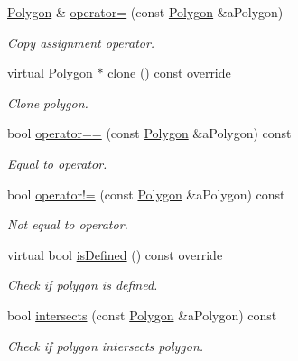 \begin{DoxyCompactItemize}
\hyperlink{classostk_1_1math_1_1geom_1_1d2_1_1objects_1_1_polygon}{Polygon} \& \hyperlink{classostk_1_1math_1_1geom_1_1d2_1_1objects_1_1_polygon_aad1bdf4404a88c3da5c93e12e0cbb241}{operator=} (const \hyperlink{classostk_1_1math_1_1geom_1_1d2_1_1objects_1_1_polygon}{Polygon} \&a\+Polygon)
\begin{DoxyCompactList}\small\item\em Copy assignment operator. \end{DoxyCompactList}\item 
virtual \hyperlink{classostk_1_1math_1_1geom_1_1d2_1_1objects_1_1_polygon}{Polygon} $\ast$ \hyperlink{classostk_1_1math_1_1geom_1_1d2_1_1objects_1_1_polygon_a55e4524d1f58bf8379580e63f49f0b48}{clone} () const override
\begin{DoxyCompactList}\small\item\em Clone polygon. \end{DoxyCompactList}\item 
bool \hyperlink{classostk_1_1math_1_1geom_1_1d2_1_1objects_1_1_polygon_a6fa3a2d3811523250bbb916e5d0ff8b9}{operator==} (const \hyperlink{classostk_1_1math_1_1geom_1_1d2_1_1objects_1_1_polygon}{Polygon} \&a\+Polygon) const
\begin{DoxyCompactList}\small\item\em Equal to operator. \end{DoxyCompactList}\item 
bool \hyperlink{classostk_1_1math_1_1geom_1_1d2_1_1objects_1_1_polygon_a2a592e75608feeafd324105c65c67640}{operator!=} (const \hyperlink{classostk_1_1math_1_1geom_1_1d2_1_1objects_1_1_polygon}{Polygon} \&a\+Polygon) const
\begin{DoxyCompactList}\small\item\em Not equal to operator. \end{DoxyCompactList}\item 
virtual bool \hyperlink{classostk_1_1math_1_1geom_1_1d2_1_1objects_1_1_polygon_a81f92393dad2c6421fd4fe3834f60fa2}{is\+Defined} () const override
\begin{DoxyCompactList}\small\item\em Check if polygon is defined. \end{DoxyCompactList}\item 
bool \hyperlink{classostk_1_1math_1_1geom_1_1d2_1_1objects_1_1_polygon_ad0183cbb840fe9f1fb9dfde0cc3eae50}{intersects} (const \hyperlink{classostk_1_1math_1_1geom_1_1d2_1_1objects_1_1_polygon}{Polygon} \&a\+Polygon) const
\begin{DoxyCompactList}\small\item\em Check if polygon intersects polygon. \end{DoxyCompactList}\item 

\end{DoxyCompactItemize}

